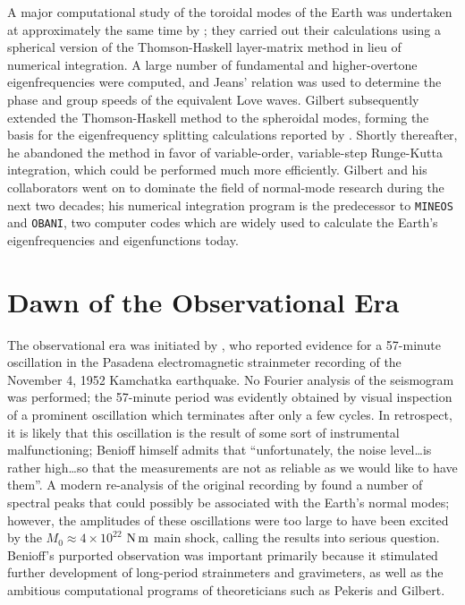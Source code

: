 A major computational study of the toroidal modes of the Earth
was undertaken at approximately the same time by
\textcite{gilbert&macdonald60}; they carried out
their calculations using a spherical version of the
Thomson-Haskell layer-matrix method in lieu of numerical integration.
%
A large number of fundamental and higher-overtone eigenfrequencies
were computed, and Jeans' relation was used to determine the
phase and group speeds of the equivalent Love waves.
Gilbert subsequently extended the Thomson-Haskell method
to the spheroidal modes, forming the basis for the eigenfrequency
splitting calculations reported by \textcite{backus&gilbert61}.
Shortly thereafter, he abandoned the method in favor of variable-order,
variable-step Runge-Kutta integration, which could be performed
much more efficiently.  Gilbert and his collaborators went on
to dominate the field of normal-mode research during the next
two decades; his numerical integration program is the predecessor
to {\tt MINEOS\/} and {\tt OBANI\/},
%
%
two computer codes which are widely used
to calculate the Earth's eigenfrequencies and eigenfunctions today.

\section{Dawn of the Observational Era}
%

The observational era was initiated by \textcite{benioff58},
who reported evidence for a 57-minute oscillation in the
Pasadena electromagnetic strainmeter recording of the
November 4, 1952 Kamchatka earthquake.
%
No Fourier analysis
of the seismogram was performed; the 57-minute period
was evidently obtained by visual inspection of a prominent
oscillation which terminates after only a few cycles.
In retrospect, it is likely that this oscillation is the
result of some sort of instrumental malfunctioning;
Benioff himself admits that ``unfortunately, the noise
level\ldots is rather high\ldots so that the measurements
are not as reliable as we would like to have them''.
A modern re-analysis of the original recording by
\textcite{kanamori76} found a number of spectral peaks
that could possibly be associated with the Earth's
normal modes; however, the amplitudes of these
oscillations were too large to have been
excited by the $M_0\approx 4\times 10^{22}$ ${\rm N}\,{\rm m}$ main shock,
calling the results into serious question.  Benioff's
purported observation was important primarily because
it stimulated further development
of long-period strainmeters and gravimeters, as well as
the ambitious computational programs of theoreticians such
as Pekeris and Gilbert.

